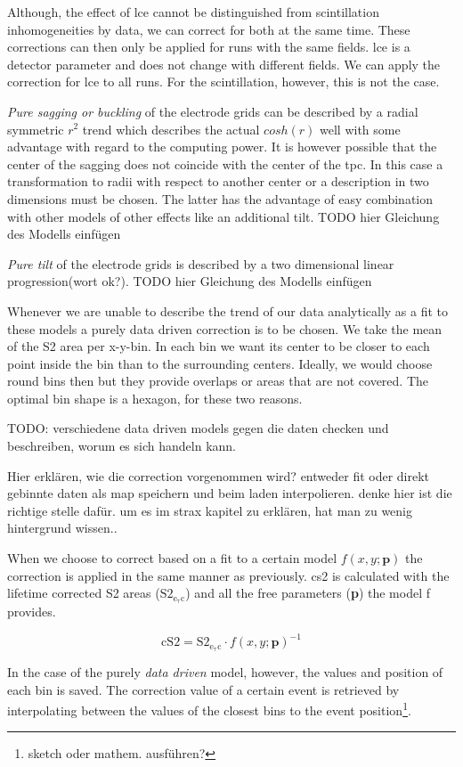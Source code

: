Although, the effect of \gls{lce} cannot be distinguished from scintillation inhomogeneities by data, we can correct for both at the same time.
These corrections can then only be applied for runs with the same fields.
\gls{lce} is a detector parameter and does not change with different fields.
We can apply the correction for \gls{lce} to all runs.
For the scintillation, however, this is not the case.




\emph{Pure sagging or buckling} of the electrode grids can be described by a radial symmetric $ r^2 $ trend which describes the actual $ cosh\left( r \right) $ well with some advantage with regard to the computing power.
It is however possible that the center of the sagging does not coincide with the center of the \gls{tpc}.
In this case a transformation to radii with respect to another center or a description in two dimensions must be chosen.
The latter has the advantage of easy combination with other models of other effects like an additional tilt.
TODO hier Gleichung des Modells einfügen

\emph{Pure tilt} of the electrode grids is described by a two dimensional linear progression(wort ok?).
TODO hier Gleichung des Modells einfügen

Whenever we are unable to describe the trend of our data analytically as a fit to these models a purely data driven correction is to be chosen.
We take the mean of the S2 area per x-y-bin.
In each bin we want its center to be closer to each point inside the bin than to the surrounding centers.
Ideally, we would choose round bins then but they provide overlaps or areas that are not covered.
The optimal bin shape is a hexagon, for these two reasons.

TODO: verschiedene data driven models gegen die daten checken und beschreiben, worum es sich handeln kann.


Hier erklären, wie die correction vorgenommen wird? entweder fit oder direkt gebinnte daten als map speichern und beim laden interpolieren. denke hier ist die richtige stelle dafür. um es im strax kapitel zu erklären, hat man zu wenig hintergrund wissen..

When we choose to correct based on a fit to a certain model $ f\left( x,y;\mathbf{p} \right) $ the correction is applied in the same manner as previously. \gls{cs2} is calculated with the lifetime corrected S2 areas ($ \mathrm{S2_\mathrm{e_\tau c}} $) and all the free parameters (\textbf{p}) the model f provides.

\begin{equation} %
    \mathrm{cS2} = \mathrm{S2_\mathrm{e_\tau c}} \cdot f\left( x,y; \mathbf{p} \right)^{-1}
    \label{eq:cs2}
\end{equation}

In the case of the purely \emph{data driven} model, however, the values and position of each bin is saved.
The correction value of a certain event is retrieved by interpolating between the values of the closest bins to the event position\footnote{sketch oder mathem. ausführen?}.


